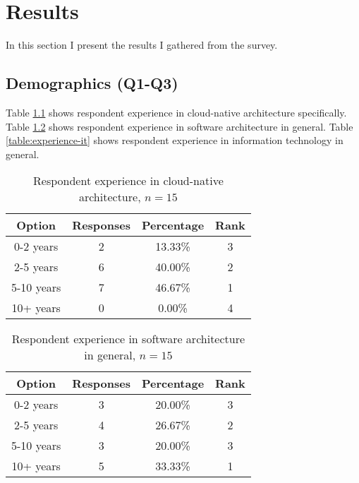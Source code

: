 \documentclass[utf8,english]{gradu3}
\begin{document}
\chapter{Results}
\label{chapter:results}

In this section I present the results I gathered from the survey.

\section{Demographics (Q1-Q3)}

Table \ref{table:experience-cna} shows respondent experience in cloud-native architecture specifically.
Table \ref{table:experience-architecture} shows respondent experience in software architecture in general.
Table \ref{table:experience-it} shows respondent experience in information technology in general.

\begin{table}[!h]
  \begin{center}
    \caption{Respondent experience in cloud-native architecture, $n = 15$}
    \label{table:experience-cna}
    \begin{tabular}{|c|c|c|c|}
      \hline
      \textbf{Option} & \textbf{Responses} & \textbf{Percentage} & \textbf{Rank} \\
      \hline
      0-2 years       & 2                  & 13.33\%             & 3             \\
      2-5 years       & 6                  & 40.00\%             & 2             \\
      5-10 years      & 7                  & 46.67\%             & 1             \\
      10+ years       & 0                  & 0.00\%              & 4             \\
      \hline
    \end{tabular}
  \end{center}
\end{table}

\begin{table}[!h]
  \begin{center}
    \caption{Respondent experience in software architecture in general, $n = 15$}
    \label{table:experience-architecture}
    \begin{tabular}{|c|c|c|c|}
      \hline
      \textbf{Option} & \textbf{Responses} & \textbf{Percentage} & \textbf{Rank} \\
      \hline
      0-2 years       & 3                  & 20.00\%             & 3             \\
      2-5 years       & 4                  & 26.67\%             & 2             \\
      5-10 years      & 3                  & 20.00\%             & 3             \\
      10+ years       & 5                  & 33.33\%             & 1             \\
      \hline
    \end{tabular}
  \end{center}
\end{table}
\end{document}
